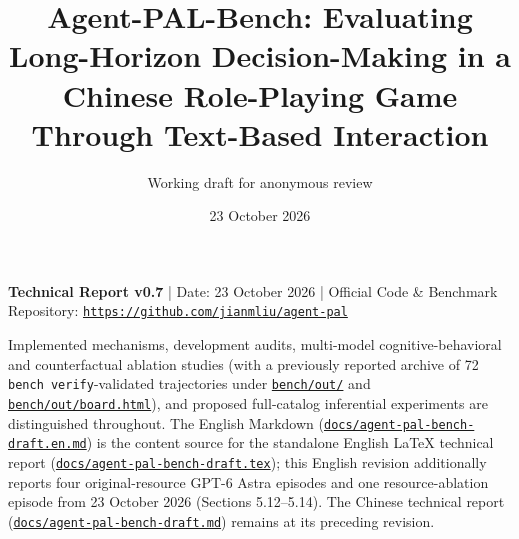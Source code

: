 \documentclass[11pt,a4paper]{article}
\title{Agent-PAL-Bench: Evaluating Long-Horizon Decision-Making in a Chinese Role-Playing Game Through Text-Based Interaction}
\author{Working draft for anonymous review}
\date{23 October 2026}
\begin{document}
\maketitle

{\footnotesize \textbf{Technical Report v0.7} | Date: 23 October 2026 | Official Code \& Benchmark Repository: \href{https://github.com/jianmliu/agent-pal}{\nolinkurl{https://github.com/jianmliu/agent-pal}}\par}
{\footnotesize \par}
{\footnotesize Implemented mechanisms, development audits, multi-model cognitive-behavioral and counterfactual ablation studies (with a previously reported archive of 72 \texttt{bench\allowbreak{} \allowbreak{}verify}-validated trajectories under \href{../bench/out/}{\texttt{bench\allowbreak{}/\allowbreak{}out\allowbreak{}/}} and \href{../bench/out/board.html}{\texttt{bench\allowbreak{}/\allowbreak{}out\allowbreak{}/\allowbreak{}board\allowbreak{}.\allowbreak{}html}}), and proposed full-catalog inferential experiments are distinguished throughout. The English Markdown (\href{./agent-pal-bench-draft.en.md}{\texttt{docs\allowbreak{}/\allowbreak{}agent\allowbreak{}-\allowbreak{}pal\allowbreak{}-\allowbreak{}bench\allowbreak{}-\allowbreak{}draft\allowbreak{}.\allowbreak{}en\allowbreak{}.\allowbreak{}md}}) is the content source for the standalone English LaTeX technical report (\href{./agent-pal-bench-draft.tex}{\texttt{docs\allowbreak{}/\allowbreak{}agent\allowbreak{}-\allowbreak{}pal\allowbreak{}-\allowbreak{}bench\allowbreak{}-\allowbreak{}draft\allowbreak{}.\allowbreak{}tex}}); this English revision additionally reports four original-resource GPT-6 Astra episodes and one resource-ablation episode from 23 October 2026 (Sections 5.12--5.14). The Chinese technical report (\href{./agent-pal-bench-draft.md}{\texttt{docs\allowbreak{}/\allowbreak{}agent\allowbreak{}-\allowbreak{}pal\allowbreak{}-\allowbreak{}bench\allowbreak{}-\allowbreak{}draft\allowbreak{}.\allowbreak{}md}}) remains at its preceding revision.\par}
\end{document}
